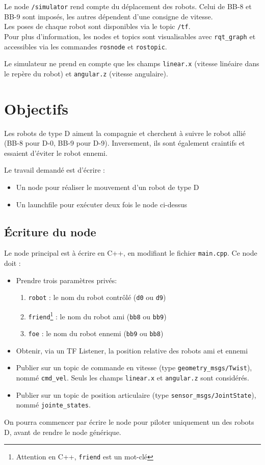 \documentclass{ecnreport}
\begin{document}
Le node \texttt{/simulator} rend compte du déplacement des robots. Celui de BB-8 et BB-9 sont imposés, les autres dépendent d'une consigne de vitesse.\\
Les poses de chaque robot sont disponibles via le topic \texttt{/tf}.\\

Pour plus d'information, les nodes et topics sont visualisables avec \texttt{rqt\_graph} et accessibles via les commandes \texttt{rosnode} et \texttt{rostopic}.

Le simulateur ne prend en compte que les champs \texttt{linear.x} (vitesse linéaire dans le repère du robot) et \texttt{angular.z} (vitesse angulaire).

\section{Objectifs}

Les robots de type D aiment la compagnie et cherchent à suivre le robot allié (BB-8 pour D-0, BB-9 pour D-9). Inversement, ils sont également craintifs et essaient d'éviter le robot ennemi.

Le travail demandé est d'écrire :
\begin{itemize}
 \item Un node pour réaliser le mouvement d'un robot de type D
 \item Un launchfile pour exécuter deux fois le node ci-dessus
\end{itemize}

\subsection{Écriture du node}

Le node principal est à écrire en C++, en modifiant le fichier \texttt{main.cpp}. Ce node doit :
\begin{itemize}
 \item Prendre trois paramètres privés:
 \begin{enumerate}
  \item \texttt{robot} : le nom du robot contrôlé (\texttt{d0} ou \texttt{d9})
  \item \texttt{friend}\footnote{Attention en C++, \texttt{friend} est un mot-clé} : le nom du robot ami (\texttt{bb8} ou \texttt{bb9})
  \item \texttt{foe} : le nom du robot ennemi (\texttt{bb9} ou \texttt{bb8})
 \end{enumerate}
 \item Obtenir, via un TF Listener, la position relative des robots ami et ennemi
 \item Publier sur un topic de commande en vitesse (type \texttt{geometry\_msgs/Twist}), nommé \texttt{cmd\_vel}. Seuls les champs \texttt{linear.x} et \texttt{angular.z} sont considérés.
 \item Publier sur un topic de position articulaire (type \texttt{sensor\_msgs/JointState}), nommé \texttt{jointe\_states}.
\end{itemize}
On pourra commencer par écrire le node pour piloter uniquement un des robots D, avant de rendre le node générique.
\end{document}
